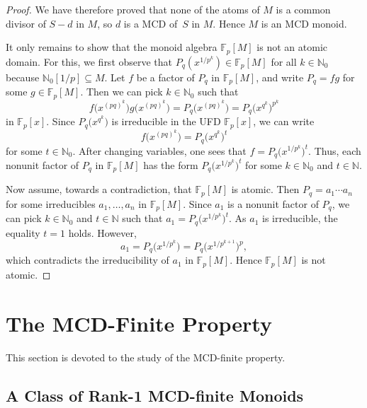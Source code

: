 \documentclass[10pt]{amsart}
\theoremstyle{definition}
\theoremstyle{remark}
\numberwithin{equation}{section}
\newcommand{\ff}{\mathbb{F}}
\newcommand{\nn}{\mathbb{N}}
\begin{document}
\begin{proof}
  We have therefore proved that none of the atoms of $M$ is a common divisor of $S-d$ in $M$, so $d$ is a MCD of~$S$ in $M$. Hence $M$ is an MCD monoid.
  \smallskip

  It only remains to show that the monoid algebra $\ff_p[M]$ is not an atomic domain. For this, we first observe that $P_q(x^{1/p^k}) \in \ff_p[M]$ for all $k \in \nn_0$ because $\nn_0[1/p] \subseteq M$. Let $f$ be a factor of $P_q$ in $\ff_p[M]$, and write $P_q = fg$ for some $g \in \ff_p[M]$. Then we can pick $k \in \nn_0$ such that
  \[
    f\big(x^{(pq)^k}\big)g\big(x^{(pq)^k}\big) = P_q\big(x^{(pq)^k}\big) = P_q\big(x^{q^k}\big)^{p^k}
  \]
  in $\ff_p[x]$. Since $P_q\big(x^{q^k}\big)$ is irreducible in the UFD $\ff_p[x]$, we can write
  \[
    f\big(x^{(pq)^k}\big) = P_q\big(x^{q^k}\big)^t
  \]
  for some $t \in \nn_0$. After changing variables, one sees that $f = P_q\big(x^{1/p^k}\big)^t$. Thus, each nonunit factor of $P_q$ in $\ff_p[M]$ has the form $P_q\big(x^{1/p^k}\big)^t$ for some $k \in \nn_0$ and $t \in \nn$.

  Now assume, towards a contradiction, that $\ff_p[M]$ is atomic. Then $P_q = a_1 \cdots a_n$ for some irreducibles $a_1, \dots, a_n$ in $\ff_p[M]$. Since $a_1$ is a nonunit factor of $P_q$, we can pick $k \in \nn_0$ and $t \in \nn$ such that $a_1 = P_q\big(x^{1/p^k}\big)^t$. As $a_1$ is irreducible, the equality $t=1$ holds. However,
  \[
    a_1 = P_q\big(x^{1/p^k}\big) = P_q\big(x^{1/p^{k+1}}\big)^p,
  \]
  which contradicts the irreducibility of $a_1$ in $\ff_p[M]$. Hence $\ff_p[M]$ is not atomic.
\end{proof}










\bigskip
\section{The MCD-Finite Property}
\label{sec:the MCD-finite property}

This section is devoted to the study of the MCD-finite property.

\medskip
\subsection{A Class of Rank-1 MCD-finite Monoids}
\end{document}
